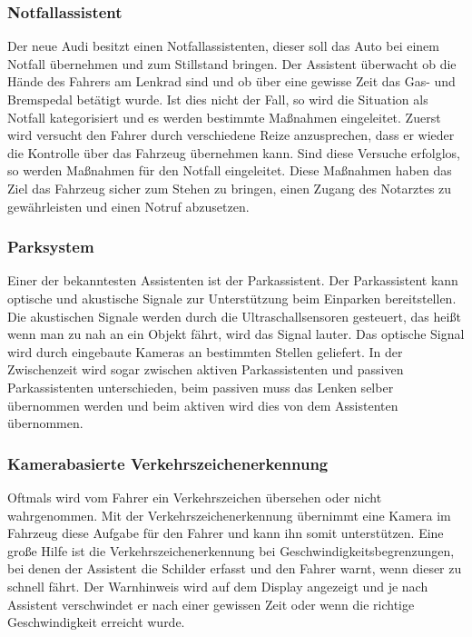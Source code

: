         \subsubsection{Notfallassistent}
        Der neue Audi besitzt einen Notfallassistenten, dieser soll das Auto bei einem Notfall übernehmen 
        und zum Stillstand bringen. Der Assistent überwacht ob die Hände des Fahrers am Lenkrad sind und 
        ob über eine gewisse Zeit das Gas- und Bremspedal betätigt wurde. Ist dies nicht der Fall, so 
        wird die Situation als Notfall kategorisiert und es werden bestimmte Maßnahmen eingeleitet.
        Zuerst wird versucht den Fahrer durch verschiedene Reize anzusprechen, dass er wieder die Kontrolle 
        über das Fahrzeug übernehmen kann. Sind diese Versuche erfolglos, so werden Maßnahmen für den 
        Notfall eingeleitet. Diese Maßnahmen haben das Ziel das Fahrzeug sicher zum Stehen zu bringen, einen Zugang des 
        Notarztes zu gewährleisten und einen Notruf abzusetzen.
        ~\cite{Audi.PB1}
        
        \subsubsection{Parksystem}
        Einer der bekanntesten Assistenten ist der Parkassistent. Der Parkassistent kann optische und 
        akustische Signale zur Unterstützung beim Einparken bereitstellen. Die akustischen Signale werden
        durch die Ultraschallsensoren gesteuert, das heißt wenn man zu nah an ein Objekt fährt, wird das Signal
        lauter. Das optische Signal wird durch eingebaute Kameras an bestimmten Stellen geliefert.
        In der Zwischenzeit wird sogar zwischen aktiven Parkassistenten und passiven Parkassistenten 
        unterschieden, beim passiven muss das Lenken selber übernommen werden und beim aktiven wird 
        dies von dem Assistenten übernommen.
        ~\cite{parkassi.PB1} ~\cite{assistenzsysteme.PB1} ~\cite{parkassi.PB2}
        
        \subsubsection{Kamerabasierte Verkehrszeichenerkennung}
        Oftmals wird vom Fahrer ein Verkehrszeichen übersehen oder nicht wahrgenommen. Mit der Verkehrszeichenerkennung 
        übernimmt eine Kamera im Fahrzeug diese Aufgabe für den Fahrer und kann ihn somit unterstützen.
        Eine große Hilfe ist die Verkehrszeichenerkennung bei Geschwindigkeitsbegrenzungen, bei denen der 
        Assistent die Schilder erfasst und den Fahrer warnt, wenn dieser zu schnell fährt. Der Warnhinweis 
        wird auf dem Display angezeigt und je nach Assistent verschwindet er nach einer gewissen Zeit oder 
        wenn die richtige Geschwindigkeit erreicht wurde.
        ~\cite{assistenzsysteme.PB1} ~\cite{verkehrszeichenerk.PB1} ~\cite{verkehrszeichenerk.PB2}
        
